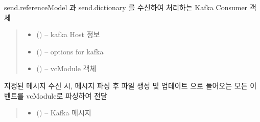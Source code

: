 \documentclass[a4paper,10pt,english]{sphinxmanual}
\begin{document}
\begin{fulllineitems}
\label{\detokenize{_VCConsumer:vcConsumer}}
\pysigstartsignatures
{}
\pysigstopsignatures
\sphinxAtStartPar
send.referenceModel 과 send.dictionary 를 수신하여 처리하는 Kafka Consumer 객체
\begin{quote}\begin{description}
\begin{itemize}
\item {} 
\sphinxAtStartPar
{} () – kafka Host 정보

\item {} 
\sphinxAtStartPar
{} () – options for kafka

\item {} 
\sphinxAtStartPar
{} ({\hyperref[\detokenize{_VCModule:vcModule}]{}}) – vcModule 객체

\end{itemize}

\end{description}\end{quote}

\begin{fulllineitems}
\label{\detokenize{_VCConsumer:vcConsumer.handler}}
\pysigstartsignatures
{}
\pysigstopsignatures
\sphinxAtStartPar
지정된 메시지 수신 시, 메시지 파싱 후 파일 생성 및 업데이트
 으로 들어오는 모든 이벤트를 vcModule로 파싱하여 전달
\begin{quote}\begin{description}
\begin{itemize}
\item {} 
\sphinxAtStartPar
{} () – Kafka 메시지


\end{itemize}
\end{description}
\end{quote}
\end{fulllineitems}
\end{fulllineitems}
\end{document}
